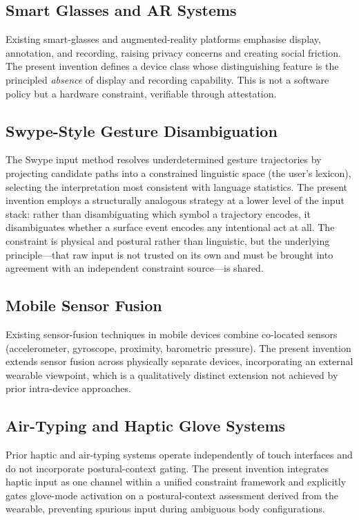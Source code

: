 \documentclass[11pt,letterpaper]{article}
\begin{document}
\subsection{Smart Glasses and AR Systems}

Existing smart-glasses and augmented-reality platforms emphasise display, annotation,
and recording, raising privacy concerns and creating social friction. The present
invention defines a device class whose distinguishing feature is the principled
\emph{absence} of display and recording capability. This is not a software policy
but a hardware constraint, verifiable through attestation.

\subsection{Swype-Style Gesture Disambiguation}

The Swype input method resolves underdetermined gesture trajectories by projecting
candidate paths into a constrained linguistic space (the user's lexicon), selecting
the interpretation most consistent with language statistics. The present invention
employs a structurally analogous strategy at a lower level of the input stack:
rather than disambiguating which symbol a trajectory encodes, it disambiguates
whether a surface event encodes any intentional act at all. The constraint is
physical and postural rather than linguistic, but the underlying principle---that
raw input is not trusted on its own and must be brought into agreement with an
independent constraint source---is shared.

\subsection{Mobile Sensor Fusion}

Existing sensor-fusion techniques in mobile devices combine co-located sensors
(accelerometer, gyroscope, proximity, barometric pressure). The present invention
extends sensor fusion across physically separate devices, incorporating an
external wearable viewpoint, which is a qualitatively distinct extension not
achieved by prior intra-device approaches.

\subsection{Air-Typing and Haptic Glove Systems}

Prior haptic and air-typing systems operate independently of touch interfaces and
do not incorporate postural-context gating. The present invention integrates haptic
input as one channel within a unified constraint framework and explicitly gates
glove-mode activation on a postural-context assessment derived from the wearable,
preventing spurious input during ambiguous body configurations.
\end{document}
